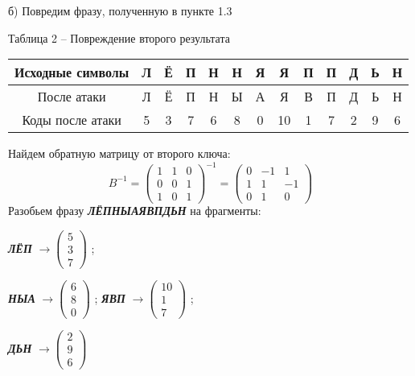 \documentclass[a5paper, 10pt]{article}
\theoremstyle{definition}
\theoremstyle{plain}
\theoremstyle{remark}
\begin{document}
 б) Повредим фразу, полученную в пункте 1.3
\begin{center}
Таблица 2 -- Повреждение  второго результата\\
\begin{tabular}{ |c|c|c|c|c|c|c|c|c|c|c|c|c| } 
 \hline
Исходные символы & Л & Ё & П & Н & Н  & Я & Я  & П & П  & Д & Ь  & Н\\
\hline
После атаки & Л & Ё & П & Н & Ы  & А & Я  & В & П  & Д & Ь  & Н\\
 \hline
Коды после атаки & 5 & 3 & 7 & 6 & 8  & 0 & 10  & 1 & 7  & 2 & 9  & 6  \\
 \hline
\end{tabular}
\end{center}
Найдем обратную матрицу от второго ключа:
\begin{equation}
B^{-1} = 
\begin{pmatrix}
  1 & 1 & 0 \\
0 & 0 & 1\\
1 & 0 & 1
\end{pmatrix}^{-1}
 = 
\begin{pmatrix}
 0 & -1 & 1 \\
1 & 1 & -1\\
0 & 1 & 0
\end{pmatrix}
\end{equation}
Разобьем фразу  \textbf{\textit{ЛЁПНЫАЯВПДЬН}} на фрагменты:
\begin{center}
\textbf{\textit{ЛЁП}} $\to \begin{pmatrix}
 5\\
3\\
7
\end{pmatrix}$ ;

\textbf{\textit{НЫА}}  $\to \begin{pmatrix}
6\\
8\\
0
\end{pmatrix}$ ;
\textbf{\textit{ЯВП}}  $\to \begin{pmatrix}
 10\\
1\\
7
\end{pmatrix}$ ;

\textbf{\textit{ДЬН}}  $\to \begin{pmatrix}
2\\
9\\
6
\end{pmatrix}$ \\
\end{center}
\end{document}
